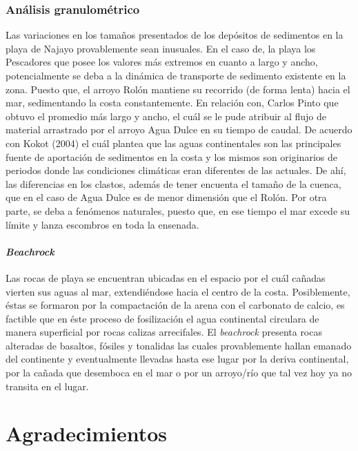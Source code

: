 \documentclass[11pt,]{article}
\begin{document}
\subsubsection{Análisis
granulométrico}\label{anuxe1lisis-granulomuxe9trico-1}

Las variaciones en los tamaños presentados de los depósitos de
sedimentos en la playa de Najayo provablemente sean inusuales. En el
caso de, la playa los Pescadores que posee los valores más extremos en
cuanto a largo y ancho, potencialmente se deba a la dinámica de
transporte de sedimento existente en la zona. Puesto que, el arroyo
Rolón mantiene su recorrido (de forma lenta) hacia el mar, sedimentando
la costa constantemente. En relación con, Carlos Pinto que obtuvo el
promedio más largo y ancho, el cuál se le pude atribuir al flujo de
material arrastrado por el arroyo Agua Dulce en su tiempo de caudal. De
acuerdo con Kokot (2004) el cuál plantea que las aguas continentales son
las principales fuente de aportación de sedimentos en la costa y los
mismos son originarios de periodos donde las condiciones climáticas eran
diferentes de las actuales. De ahí, las diferencias en los clastos,
además de tener encuenta el tamaño de la cuenca, que en el caso de Agua
Dulce es de menor dimensión que el Rolón. Por otra parte, se deba a
fenómenos naturales, puesto que, en ese tiempo el mar excede su límite y
lanza escombros en toda la ensenada.

\paragraph{\texorpdfstring{\emph{Beachrock}}{Beachrock}}\label{beachrock}

Las rocas de playa se encuentran ubicadas en el espacio por el cuál
cañadas vierten sus aguas al mar, extendiéndose hacia el centro de la
costa. Posiblemente, éstas se formaron por la compactación de la arena
con el carbonato de calcio, es factible que en éste proceso de
fosilización el agua continental circulara de manera superficial por
rocas calizas arrecifales. El \emph{beachrock} presenta rocas alteradas
de basaltos, fósiles y tonalidas las cuales provablemente hallan emanado
del continente y eventualmente llevadas hasta ese lugar por la deriva
continental, por la cañada que desemboca en el mar o por un arroyo/río
que tal vez hoy ya no transita en el lugar.

\section{Agradecimientos}\label{agradecimientos}
\end{document}
